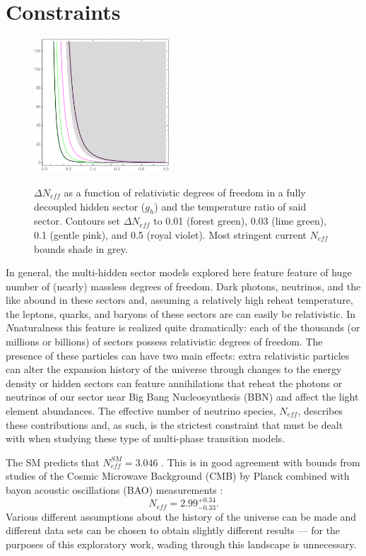 \documentclass[nofootinbib,twocolumn,preprintnumbers]{revtex4-2}
\begin{document}
\section{Constraints}
\label{sec:constraints}

\begin{figure}
\centering
\includegraphics[width=0.45\textwidth]{NeffBounds.png}
\label{fig:Neff}
\hfill
\caption{$\Delta N_{eff}$ as a function of relativistic degrees of freedom in a fully decoupled hidden sector ($g_h$) and the temperature ratio of said sector. Contours set $\Delta N_{eff}$ to 0.01 (forest green), 0.03 (lime green), 0.1 (gentle pink), and 0.5 (royal violet). Most stringent current $N_{eff}$ bounds shade in grey. 
}
\end{figure}

In general, the multi-hidden sector models explored here feature feature of huge number of (nearly) massless degrees of freedom. Dark photons, neutrinos, and the like abound in these sectors and, assuming a relatively high reheat temperature, the leptons, quarks, and baryons of these sectors are can easily be relativistic. In $N$naturalness this feature is realized quite dramatically: each of the thousands (or millions or billions) of sectors possess relativistic degrees of freedom. The presence of these particles can have two main effects: extra relativistic particles can alter the expansion history of the universe through changes to the energy density or hidden sectors can feature annihilations that reheat the photons or neutrinos of our sector near Big Bang Nucleosynthesis (BBN) and affect the light element abundances. The effective number of neutrino species, $N_{eff}$, describes these contributions and, as such, is the strictest constraint that must be dealt with when studying these type of multi-phase transition models. 

The SM predicts that $N^{SM}_{eff} = 3.046$ \cite{Mangano:2005cc}. This is in good agreement with bounds from studies of the Cosmic Microwave Background (CMB) by Planck combined with bayon acoustic oscillations (BAO) measurements \cite{Aghanim:2018eyx}:
\begin{equation}\label{eqn:NeffBounds}
N_{eff} = 2.99^{+0.34}_{-0.33}.
\end{equation}
Various different assumptions about the history of the universe can be made and different data sets can be chosen to obtain slightly different results \cite{Breitbach:2018ddu} --- for the purposes of this exploratory work, wading through this landscape is unnecessary.
\end{document}

